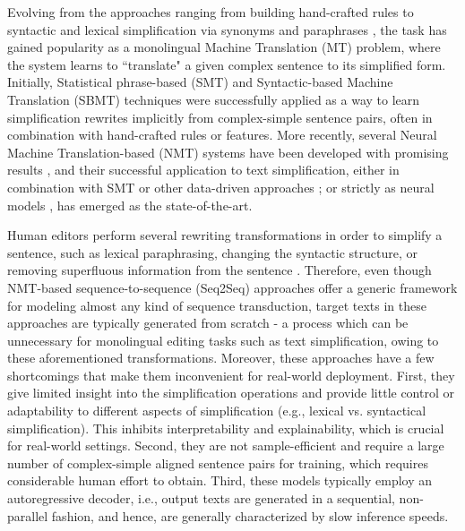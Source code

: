 \documentclass[11pt,a4paper]{article}
\begin{document}
Evolving from the approaches ranging from building hand-crafted rules \cite{chandrasekar-etal-1996-motivations, Siddharthan2006} to syntactic and lexical simplification via synonyms and paraphrases \cite{oro58886, kaji-etal-2002-verb, horn-etal-2014-learning, glavas-stajner-2015-simplifying}, the task has gained popularity as a monolingual Machine Translation (MT) problem, where the system learns to ``translate" a given complex sentence to its simplified form. Initially, Statistical phrase-based (SMT) and Syntactic-based Machine Translation (SBMT) techniques  \cite{zhu-etal-2010-monolingual, 10.1007/978-3-642-12320-7_5, coster-kauchak-2011-learning, wubben-etal-2012-sentence, narayan-gardent-2014-hybrid, stajner-etal-2015-deeper, xu-etal-2016-optimizing} were successfully applied as a way to learn simplification rewrites implicitly from complex-simple sentence pairs, often in combination with hand-crafted rules or features. More recently, several Neural Machine Translation-based (NMT) systems have been developed with promising results \cite{NIPS2014_5346, cho-etal-2014-learning, DBLP:journals/corr/BahdanauCB14}, and their successful application to text simplification, either in combination with SMT or other data-driven approaches \cite{Zhang2017ACS, zhao-etal-2018-integrating}; or strictly as neural models \cite{AAAI1611944, nisioi-etal-2017-exploring, zhang-lapata-2017-sentence, stajner-nisioi-2018-detailed, guo-etal-2018-dynamic, vu-etal-2018-sentence, 10.1007/978-3-030-04221-9_48, kriz-etal-2019-complexity, surya-etal-2019-unsupervised, DBLP:conf/aaai/ZhaoCCY20}, has emerged as the state-of-the-art. 

Human editors perform several rewriting transformations in order to simplify a sentence, such as lexical paraphrasing, changing the syntactic structure, or removing superfluous information from the sentence \cite{Petersen07textsimplification, Alusio2008ACA, mallinson2020felix}. Therefore, even though NMT-based sequence-to-sequence (Seq2Seq) approaches offer a generic framework for modeling almost any kind of sequence transduction, target texts in these approaches are typically generated from scratch - a process which can be unnecessary for monolingual editing tasks such as text simplification, owing to these aforementioned transformations. Moreover, these approaches have a few shortcomings that make them inconvenient for real-world deployment. First, they give limited insight into the simplification operations and provide little control or adaptability to different aspects of simplification (e.g., lexical vs. syntactical simplification). This inhibits interpretability and explainability, which is crucial for real-world settings. Second, they are not sample-efficient and require a large number of complex-simple aligned sentence pairs for training, which requires considerable human effort to obtain. Third, these models typically employ an autoregressive decoder, i.e., output texts are generated in a sequential, non-parallel fashion, and hence, are generally characterized by slow inference speeds.
\end{document}
